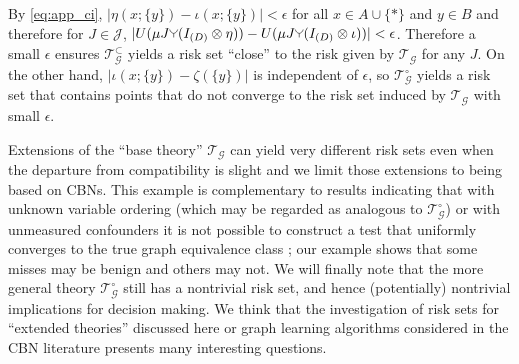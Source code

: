 \begin{example}
By \ref{eq:app_ci}, $|\eta(x;\{y\})-\iota(x;\{y\})|<\epsilon$ for all $x\in A\cup\{*\}$ and $y\in B$ and therefore for $J\in \mathscr{J}$, $|U(\mu J\splitter{0.1} (I_{(D)}\otimes \eta)) - U(\mu J\splitter{0.1} (I_{(D)}\otimes \iota))|<\epsilon$. Therefore a small $\epsilon$ ensures $\mathscr{T}^\subset_{\mathcal{G}}$ yields a risk set ``close'' to the risk given by $\mathscr{T}_{\mathcal{G}}$ for any $J$. On the other hand, $|\iota(x;\{y\})-\zeta(\{y\})|$ is independent of $\epsilon$, so $\mathscr{T}^\circ_{\mathcal{G}}$ yields a risk set that contains points that do not converge to the risk set induced by $\mathscr{T}_{\mathcal{G}}$ with small $\epsilon$.
\end{example}

Extensions of the ``base theory'' $\mathscr{T}_{\mathcal{G}}$ can yield very different risk sets even when the departure from compatibility is slight and we limit those extensions to being based on CBNs. This example is complementary to results indicating that with unknown variable ordering (which may be regarded as analogous to $\mathscr{T}_{\mathcal{G}}^\circ$) or with unmeasured confounders it is not possible to construct a test that uniformly converges to the true graph equivalence class \citep{robins_uniform_2003,zhang_strong_2003}; our example shows that some misses may be benign and others may not. We will finally note that the more general theory $\mathscr{T}^\circ_{\mathcal{G}}$ still has a nontrivial risk set, and hence (potentially) nontrivial implications for decision making. We think that the investigation of risk sets for ``extended theories'' discussed here or graph learning algorithms considered in the CBN literature presents many interesting questions.